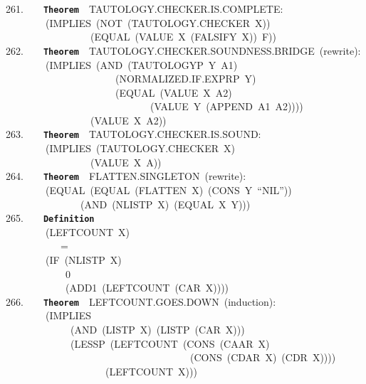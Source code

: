 \documentclass[11pt]{book}
\newenvironment{pubasis}{\begin{flushleft}\ttfamily\small}{\normalsize\rmfamily\end{flushleft}}
\newcommand{\axiomordefinition}[1]{\vspace{6pt}\texttt{\textbf{#1}}}
\begin{document}
\begin{pubasis}
261.~~~~\axiomordefinition{Theorem}~~TAU\-TOL\-OGY.CHECK\-ER.IS.COMPLETE:\\
~~~~~~~~(IMPLIES~(NOT~(TAU\-TOL\-OGY.CHECK\-ER~X))\\
~~~~~~~~~~~~~~~~~(EQUAL~(VALUE~X~(FALSIFY~X))~F))\\

262.~~~~\axiomordefinition{Theorem}~~TAU\-TOL\-OGY.CHECK\-ER.SOUNDNESS.BRIDGE~(rewrite):\\
~~~~~~~~(IMPLIES~(AND~(TAUTOLOGYP~Y~A1)\\
~~~~~~~~~~~~~~~~~~~~~~(NOR\-MAL\-IZED.IF.EXPRP~Y)\\
~~~~~~~~~~~~~~~~~~~~~~(EQUAL~(VALUE~X~A2)\\
~~~~~~~~~~~~~~~~~~~~~~~~~~~~~(VALUE~Y~(APPEND~A1~A2))))\\
~~~~~~~~~~~~~~~~~(VALUE~X~A2))\\

263.~~~~\axiomordefinition{Theorem}~~TAU\-TOL\-OGY.CHECK\-ER.IS.SOUND:\\
~~~~~~~~(IMPLIES~(TAU\-TOL\-OGY.CHECK\-ER~X)\\
~~~~~~~~~~~~~~~~~(VALUE~X~A))\\

264.~~~~\axiomordefinition{Theorem}~~FLAT\-TEN.SINGLE\-TON~(rewrite):\\
~~~~~~~~(EQUAL~(EQUAL~(FLATTEN~X)~(CONS~Y~``NIL''))\\
~~~~~~~~~~~~~~~(AND~(NLISTP~X)~(EQUAL~X~Y)))\\

265.~~~~\axiomordefinition{Definition}\\
~~~~~~~~(LEFTCOUNT~X)\\
~~~~~~~~~~~=\\
~~~~~~~~(IF~(NLISTP~X)\\
~~~~~~~~~~~~0\\
~~~~~~~~~~~~(ADD1~(LEFTCOUNT~(CAR~X))))\\

266.~~~~\axiomordefinition{Theorem}~~LEFT\-COUNT.GOES.DOWN~(induction):\\
~~~~~~~~(IMPLIES\\
~~~~~~~~~~~~~(AND~(LISTP~X)~(LISTP~(CAR~X)))\\
~~~~~~~~~~~~~(LESSP~(LEFTCOUNT~(CONS~(CAAR~X)\\
~~~~~~~~~~~~~~~~~~~~~~~~~~~~~~~~~~~~~(CONS~(CDAR~X)~(CDR~X))))\\
~~~~~~~~~~~~~~~~~~~~(LEFTCOUNT~X)))\\


\end{pubasis}
\end{document}
